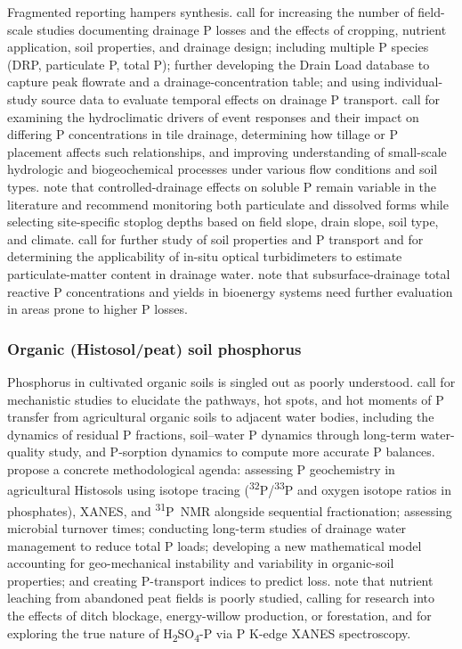 Fragmented reporting hampers synthesis. \textcite{Christianson2016} call for increasing the number of field-scale studies documenting drainage P losses and the effects of cropping, nutrient application, soil properties, and drainage design; including multiple P species (DRP, particulate P, total P); further developing the Drain Load database to capture peak flowrate and a drainage-concentration table; and using individual-study source data to evaluate temporal effects on drainage P transport. \textcite{Macrae2019} call for examining the hydroclimatic drivers of event responses and their impact on differing P concentrations in tile drainage, determining how tillage or P placement affects such relationships, and improving understanding of small-scale hydrologic and biogeochemical processes under various flow conditions and soil types. \textcite{Tanga2025} note that controlled-drainage effects on soluble P remain variable in the literature and recommend monitoring both particulate and dissolved forms while selecting site-specific stoplog depths based on field slope, drain slope, soil type, and climate. \textcite{Grant1996} call for further study of soil properties and P transport and for determining the applicability of in-situ optical turbidimeters to estimate particulate-matter content in drainage water. \textcite{Daigh2015b} note that subsurface-drainage total reactive P concentrations and yields in bioenergy systems need further evaluation in areas prone to higher P losses.

\subsubsection{Organic (Histosol/peat) soil phosphorus}

Phosphorus in cultivated organic soils is singled out as poorly understood. \textcite{Grenon2022} call for mechanistic studies to elucidate the pathways, hot spots, and hot moments of P transfer from agricultural organic soils to adjacent water bodies, including the dynamics of residual P fractions, soil--water P dynamics through long-term water-quality study, and P-sorption dynamics to compute more accurate P balances. \textcite{Grenon2021} propose a concrete methodological agenda: assessing P geochemistry in agricultural Histosols using isotope tracing (\textsuperscript{32}P/\textsuperscript{33}P and oxygen isotope ratios in phosphates), XANES, and \textsuperscript{31}P~NMR alongside sequential fractionation; assessing microbial turnover times; conducting long-term studies of drainage water management to reduce total P loads; developing a new mathematical model accounting for geo-mechanical instability and variability in organic-soil properties; and creating P-transport indices to predict loss. \textcite{Höyhtyä2025} note that nutrient leaching from abandoned peat fields is poorly studied, calling for research into the effects of ditch blockage, energy-willow production, or forestation, and for exploring the true nature of H\textsubscript{2}SO\textsubscript{4}-P via P K-edge XANES spectroscopy.

